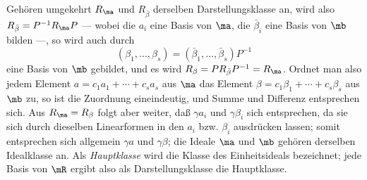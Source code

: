 Gehören umgekehrt $R_\ma$ und $R_{\bar\beta}$ derselben Darstellungsklasse an, wird also $R_{\bar\beta}=P^{-1}R_\ma P$ --- wobei die $a_i$ eine Basis von $\ma$, die $\bar\beta_i$ eine Basis von $\mb$ bilden ---, so wird auch durch
\[
(\beta_1,\ldots,\beta_s)=(\bar\beta_1,\ldots,\bar\beta_s)P^{-1}
\]
eine Basis von $\mb$ gebildet, und es wird $R_\beta=PR_{\bar\beta}P^{-1}=R_\ma$. Ordnet man also jedem Element $a=c_1a_1+\cdots+c_sa_s$ aus $\ma$ das Element $\beta=c_1\beta_1+\cdots+c_s\beta_s$ aus $\mb$ zu, so ist die Zuordnung eineindeutig, und Summe und Differenz entsprechen sich. Aus $R_\ma=R_\beta$ folgt aber weiter, daß $\gamma a_i$ und $\gamma\beta_i$ sich entsprechen, da sie sich durch dieselben Linearformen in den $a_i$ bzw. $\beta_i$ ausdrücken lassen; somit entsprechen sich allgemein $\gamma a$ und $\gamma\beta$; die Ideale $\ma$ und $\mb$ gehören derselben Idealklasse an. Als \emph{Hauptklasse} wird die Klasse des Einheitsideals bezeichnet; jede Basis von $\mR$ ergibt also als Darstellungsklasse die Hauptklasse.